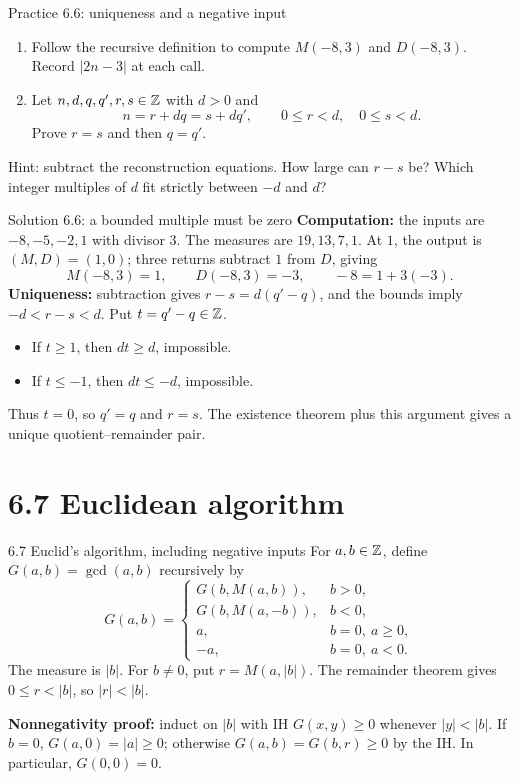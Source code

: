\begin{frame}{Practice 6.6: uniqueness and a negative input}
\begin{enumerate}
\item Follow the recursive definition to compute $M(-8,3)$ and $D(-8,3)$.
Record $|2n-3|$ at each call.
\item Let $n,d,q,q',r,s\in\mathbb{Z}$ with $d>0$ and
\[
 n=r+dq=s+dq',\qquad 0\le r<d,\quad0\le s<d.
\]
Prove $r=s$ and then $q=q'$.
\end{enumerate}
Hint: subtract the reconstruction equations. How large can $r-s$ be?
Which integer multiples of $d$ fit strictly between $-d$ and $d$?
\end{frame}

\begin{frame}{Solution 6.6: a bounded multiple must be zero}
\textbf{Computation:} the inputs are $-8,-5,-2,1$ with divisor $3$.
The measures are $19,13,7,1$. At $1$, the output is $(M,D)=(1,0)$;
three returns subtract $1$ from $D$, giving
\[
 M(-8,3)=1,\qquad D(-8,3)=-3,\qquad -8=1+3(-3).
\]
\textbf{Uniqueness:} subtraction gives $r-s=d(q'-q)$, and the bounds imply
$-d<r-s<d$. Put $t=q'-q\in\mathbb{Z}$.
\begin{itemize}
\item If $t\ge1$, then $dt\ge d$, impossible.
\item If $t\le-1$, then $dt\le-d$, impossible.
\end{itemize}
Thus $t=0$, so $q'=q$ and $r=s$.
The existence theorem plus this argument gives a unique quotient--remainder pair.
\end{frame}

\section{6.7 Euclidean algorithm}
\begin{frame}{6.7 Euclid's algorithm, including negative inputs}
For $a,b\in\mathbb{Z}$, define $G(a,b)=\gcd(a,b)$ recursively by
\[
 G(a,b)=\begin{cases}
 G(b,M(a,b)),&b>0,\\
 G(b,M(a,-b)),&b<0,\\
 a,&b=0,\ a\ge0,\\
 -a,&b=0,\ a<0.
 \end{cases}
\]
The measure is $|b|$. For $b\ne0$, put $r=M(a,|b|)$.
The remainder theorem gives $0\le r<|b|$, so $|r|<|b|$.

\textbf{Nonnegativity proof:} induct on $|b|$ with IH
$G(x,y)\ge0$ whenever $|y|<|b|$.
If $b=0$, $G(a,0)=|a|\ge0$; otherwise $G(a,b)=G(b,r)\ge0$ by the IH.
In particular, $G(0,0)=0$.
\end{frame}

